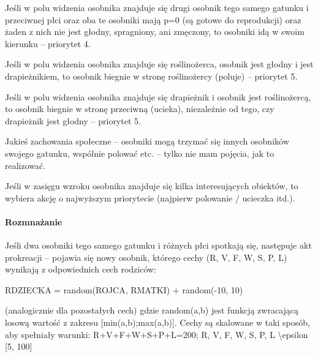 \begin{DoxyItemize}
\item Jeśli w polu widzenia osobnika znajduje się drugi osobnik tego samego gatunku i przeciwnej płci oraz oba te osobniki mają p=0 (są gotowe do reprodukcji) oraz żaden z nich nie jest głodny, spragniony, ani zmęczony, to osobniki idą w swoim kierunku – priorytet 4.
\end{DoxyItemize}


\begin{DoxyItemize}
\item Jeśli w polu widzenia osobnika znajduje się roślinożerca, osobnik jest głodny i jest drapieżnikiem, to osobnik biegnie w stronę roślinożercy (poluje) – priorytet 5.
\end{DoxyItemize}


\begin{DoxyItemize}
\item Jeśli w polu widzenia osobnika znajduje się drapieżnik i osobnik jest roślinożercą, to osobnik biegnie w stronę przeciwną (ucieka), niezależnie od tego, czy drapieżnik jest głodny – priorytet 5.
\end{DoxyItemize}

Jakieś zachowania społeczne – osobniki mogą trzymać się innych osobników swojego gatunku, wspólnie polować etc. – tylko nie mam pojęcia, jak to realizować.

Jeśli w zasięgu wzroku osobnika znajduje się kilka interesujących obiektów, to wybiera akcję o najwyższym priorytecie (najpierw polowanie / ucieczka itd.).

\paragraph*{Rozmnażanie}

Jeśli dwa osobniki tego samego gatunku i różnych płci spotkają się, następuje akt prokreacji – pojawia się nowy osobnik, którego cechy (R, V, F, W, S, P, L) wynikają z odpowiednich cech rodziców\-:

{\ttfamily R\-D\-Z\-I\-E\-C\-K\-A = random(\-R\-O\-J\-C\-A, R\-M\-A\-T\-K\-I) + random(-\/10, 10)}

(analogicznie dla pozostałych cech) gdzie {\ttfamily random(a,b)} jest funkcją zwracającą losową wartość z zakresu {\ttfamily \mbox{[}min(a,b);max(a,b)\mbox{]}}. Cechy są skalowane w taki sposób, aby spełniały warunki\-: {\ttfamily R+\-V+\-F+\-W+\-S+\-P+\-L=200; R, V, F, W, S, P, L \textbackslash{}epsilon \mbox{[}5, 100\mbox{]}}

